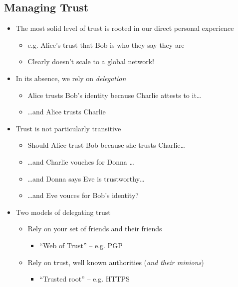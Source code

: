 \subsection{Managing Trust}
\begin{itemize}[nosep]
    \item The most solid level of trust is rooted in our direct personal experience
          \begin{itemize}[nosep]
              \item e.g. Alice's trust that Bob is who they say they are
              \item Clearly doesn't scale to a global network!
          \end{itemize}
    \item In its absence, we rely on \emph{delegation}
          \begin{itemize}[nosep]
              \item Alice trusts Bob's identity because Charlie attests to it\dots
              \item \dots and Alice trusts Charlie
          \end{itemize}
    \item Trust is not particularly transitive
          \begin{itemize}[nosep]
              \item Should Alice trust Bob because she trusts Charlie\dots
              \item \dots and Charlie vouches for Donna \dots
              \item \dots and Donna says Eve is trustworthy\dots
              \item \dots and Eve vouces for Bob's identity?
          \end{itemize}
    \item Two models of delegating trust
          \begin{itemize}[nosep]
              \item Rely on your set of friends and their friends
                    \begin{itemize}[nosep]
                        \item ``Web of Trust'' -- e.g. PGP
                    \end{itemize}
              \item Rely on trust, well known authorities (\emph{and their minions})
                    \begin{itemize}[nosep]
                        \item ``Trusted root'' -- e.g. HTTPS
                    \end{itemize}
          \end{itemize}
\end{itemize}

